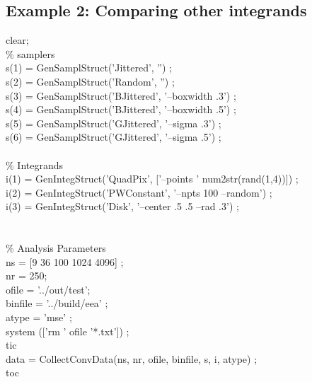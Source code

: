 \subsection{Example 2: Comparing other integrands}\label{sec:explotint}
\begin{tcolorbox}
clear; \\
\%  samplers  \\
s(1) = GenSamplStruct('Jittered', '') ; \\
s(2) = GenSamplStruct('Random', '') ; \\
s(3) = GenSamplStruct('BJittered', '--boxwidth .3') ;\\
s(4) = GenSamplStruct('BJittered', '--boxwidth .5') ;\\
s(5) = GenSamplStruct('GJittered', '--sigma .3') ;\\
s(6) = GenSamplStruct('GJittered', '--sigma .5') ;\\
\\
\%  Integrands\\
i(1) = GenIntegStruct('QuadPix', ['--points ' num2str(rand(1,4))]) ;\\
i(2) = GenIntegStruct('PWConstant', '--npts 100 --random') ;\\
i(3) = GenIntegStruct('Disk', '--center .5 .5 --rad .3') ;\\
\\
\\
\% Analysis Parameters\\
ns = [9 36 100 1024 4096] ;\\
nr =  250;\\
ofile = '../out/test';\\
binfile = '../build/eea' ;\\
atype = 'mse' ;\\

system (['rm ' ofile '*.txt']) ;\\
tic\\
data = CollectConvData(ns, nr, ofile, binfile, s, i, atype) ;\\
toc
\end{tcolorbox}

